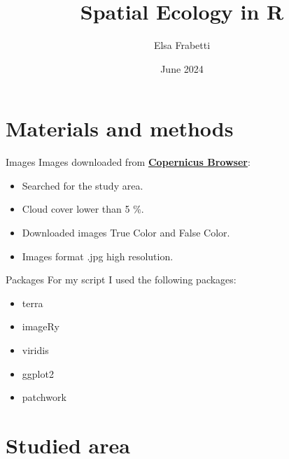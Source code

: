 \documentclass{beamer} %
\title{Spatial Ecology in R}
\author{Elsa Frabetti}
\institute{Global change ecology - Unibo}
\date{June 2024}
\begin{document}
\maketitle %


\section{Materials and methods} %

\begin{frame}{Images} %
    Images downloaded from \textbf{\href{https://browser.dataspace.copernicus.eu}{Copernicus Browser}}:
    \bigskip
    \begin{itemize}
        \item Searched for the study area.
        \item  Cloud cover lower than 5 \%.
        \item Downloaded images True Color and False Color.
        \item Images format .jpg high resolution.
    \end{itemize}
\end{frame}

\begin{frame}{Packages} 
    For my script I used the following packages:
    \bigskip %
    \begin{itemize} %
        \item terra
        \item imageRy
        \item viridis
        \item ggplot2
        \item patchwork
        \end{itemize}
\end{frame}



\section{Studied area} %
\end{document}
